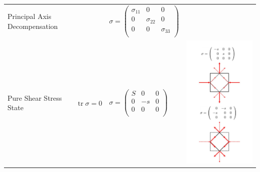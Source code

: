 \begin{tabularx}{\columnwidth}{llXX}
		Principal Axis Decompensation &&$ \sigma = \begin{pmatrix} \sigma_{11} &  0& 0\\ 0 & \sigma_{22} & 0\\ 0 & 0 & \sigma_{33}\\ \end{pmatrix}$&\\
		Pure Shear Stress State &$\operatorname{tr}\sigma = 0$&$ \sigma = \begin{pmatrix} S &  0& 0\\ 0 & -s & 0\\ 0 & 0 & 0\\ \end{pmatrix}$&		\includegraphics[scale=.3]{images/3Dcfpureshear}				\\
	\end{tabularx}
	\renewcommand{\arraystretch}{1.2}


